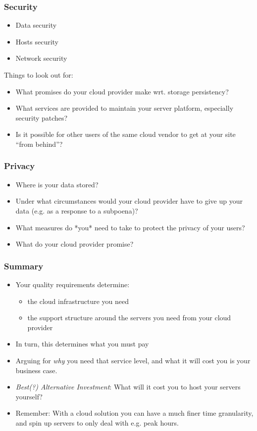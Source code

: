 \documentclass[10pt]{beamer}
\begin{document}
\begin{frame}[t]
\frametitle{Security}
\begin{itemize}
\item Data security
\item Hosts security
\item Network security
\end{itemize}

Things to look out for:
\begin{itemize}
\item What promises do your cloud provider make wrt. storage persistency?
\item What services are provided to maintain your server platform, especially security patches?
\item Is it possible for other users of the same cloud vendor to get at your site ``from behind''?
\end{itemize}

\end{frame}

\begin{frame}[t]
\frametitle{Privacy}
\begin{itemize}
\item Where is your data stored?
\item Under what circumstances would your cloud provider have to give up your data (e.g. as a response to a subpoena)?
\item What measures do *you* need to take to protect the privacy of your users?
\item What do your cloud provider promise?
\end{itemize}
\end{frame}

\begin{frame}[t]
\frametitle{Summary}
\begin{itemize}
\item Your quality requirements determine:
\begin{itemize}
\item the cloud infrastructure you need
\item the support structure around the servers you need from your cloud provider
\end{itemize}
\item In turn, this determines what you must pay
\item Arguing for \emph{why} you need that service level, and what it will cost you is your business case.
\item \emph{Best(?) Alternative Investment}: What will it cost you to host your servers yourself?
\item Remember: With a cloud solution you can have a much finer time granularity, and spin up servers to only deal with e.g. peak hours.
\end{itemize}
\end{frame}
\end{document}
